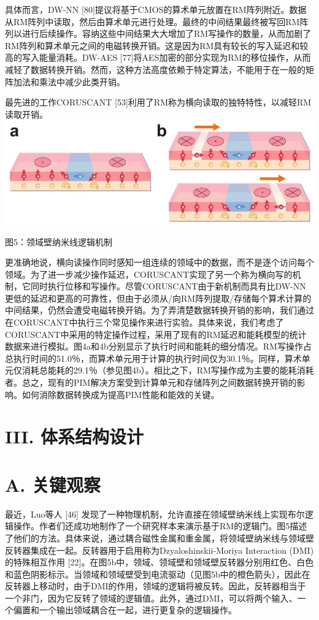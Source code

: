 \documentclass[10pt]{article}
\begin{document}
具体而言，DW-NN [80]提议将基于CMOS的算术单元放置在RM阵列附近。数据从RM阵列中读取，然后由算术单元进行处理。最终的中间结果最终被写回RM阵列以进行后续操作。容纳这些中间结果大大增加了RM写操作的数量，从而加剧了RM阵列和算术单元之间的电磁转换开销。这是因为RM具有较长的写入延迟和较高的写入能量消耗。DW-AES [77]将AES加密的部分实现为RM的移位操作，从而减轻了数据转换开销。然而，这种方法高度依赖于特定算法，不能用于在一般的矩阵加法和乘法中减少此类开销。

最先进的工作CORUSCANT [53]利用了RM称为横向读取的独特特性，以减轻RM读取开销。
\includegraphics[max width=\textwidth, center]{2024_05_12_abeba8a85da5b5ec4c7bg-04(1)}
 
图5：领域壁纳米线逻辑机制


更准确地说，横向读操作同时感知一组连续的领域中的数据，而不是逐个访问每个领域。为了进一步减少操作延迟，CORUSCANT实现了另一个称为横向写的机制，它同时执行位移和写操作。尽管CORUSCANT由于新机制而具有比DW-NN更低的延迟和更高的可靠性，但由于必须从/向RM阵列提取/存储每个算术计算的中间结果，仍然会遭受电磁转换开销。为了弄清楚数据转换开销的影响，我们通过在CORUSCANT中执行三个常见操作来进行实验。具体来说，我们考虑了CORUSCANT中采用的特定操作过程，采用了现有的RM延迟和能耗模型的统计数据来进行模拟。图4a和4b分别显示了执行时间和能耗的细分情况。RM写操作占总执行时间的51.0％，而算术单元用于计算的执行时间仅为30.1％。同样，算术单元仅消耗总能耗的29.1％（参见图4b）。相比之下，RM写操作成为主要的能耗消耗者。总之，现有的PIM解决方案受到计算单元和存储阵列之间数据转换开销的影响。如何消除数据转换成为提高PIM性能和能效的关键。


\section*{III. 体系结构设计}
\section*{A. 关键观察}
最近，Luo等人 [46] 发现了一种物理机制，允许直接在领域壁纳米线上实现布尔逻辑操作。作者们还成功地制作了一个研究样本来演示基于RM的逻辑门。图5描述了他们的方法。具体来说，通过耦合磁性金属和重金属，将领域壁纳米线与领域壁反转器集成在一起。反转器用于启用称为Dzyaloshinskii-Moriya Interaction (DMI)的特殊相互作用 [22]。在图5b中，领域、领域壁和领域壁反转器分别用红色、白色和蓝色阴影标示。当领域和领域壁受到电流驱动（见图5b中的橙色箭头），因此在反转器上移动时，由于DMI的作用，领域的逻辑将被反转。因此，反转器相当于一个非门，因为它反转了领域的逻辑值。此外，通过DMI，可以将两个输入、一个偏置和一个输出领域耦合在一起，进行更复杂的逻辑操作。
\end{document}
